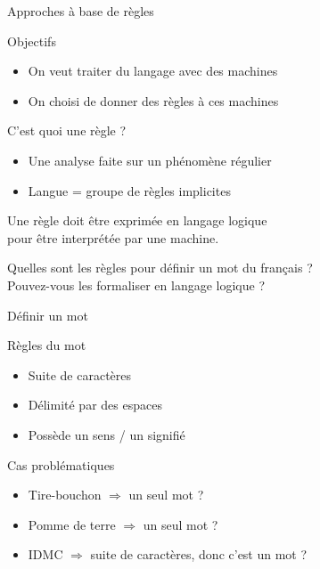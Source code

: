 \documentclass[serif, aspectratio=169]{beamer}
\begin{document}
\begin{frame}{Approches à base de règles}
    \begin{block}{Objectifs}
        \begin{itemize}
            \item On veut traiter du langage avec des machines
            \item On choisi de donner des règles à ces machines
        \end{itemize}
    \end{block}
    \begin{block}{C'est quoi une règle ?}
        \begin{itemize}
            \item Une analyse faite sur un phénomène régulier
            \item Langue = groupe de règles implicites
        \end{itemize}
    \end{block}
    \vfill
    \begin{center}
        \Large
        Une règle doit être exprimée en langage logique \\
        pour être interprétée par une machine.
    \end{center}
\end{frame}

\begin{exoframe}{}
    \begin{center}
        \Large
        Quelles sont les règles pour définir un mot du français ? \\
        \pause
        Pouvez-vous les formaliser en langage logique ?
    \end{center}
\end{exoframe}

\begin{frame}{Définir un mot}
    \begin{block}{Règles du mot}
        \begin{itemize}
            \item Suite de caractères
            \item Délimité par des espaces
            \item Possède un sens / un signifié
        \end{itemize}
    \end{block}
    \vfill
    \begin{block}{Cas problématiques}
        \begin{itemize}
            \item Tire-bouchon $\Rightarrow$ un seul mot ?
            \item Pomme de terre $\Rightarrow$ un seul mot ?
            \item IDMC $\Rightarrow$ suite de caractères, donc c'est un mot ?
        \end{itemize}
    \end{block}
\end{frame}
\end{document}
